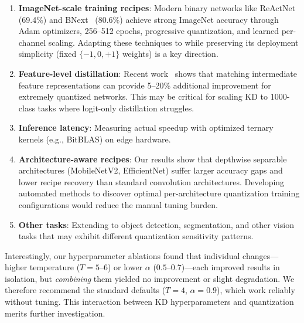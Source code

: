 \documentclass[10pt]{article}
\begin{document}
\begin{enumerate}
    \item \textbf{ImageNet-scale training recipes}: Modern binary networks like ReActNet~\cite{liu2020reactnet} (69.4\%) and BNext~\cite{guo2022bnext} (80.6\%) achieve strong ImageNet accuracy through Adam optimizers, 256--512 epochs, progressive quantization, and learned per-channel scaling. Adapting these techniques to \bitnetb{} while preserving its deployment simplicity (fixed $\{-1,0,+1\}$ weights) is a key direction.
    \item \textbf{Feature-level distillation}: Recent work~\cite{elthakeb2020dcq} shows that matching intermediate feature representations can provide 5--20\% additional improvement for extremely quantized networks. This may be critical for scaling KD to 1000-class tasks where logit-only distillation struggles.
    \item \textbf{Inference latency}: Measuring actual speedup with optimized ternary kernels (e.g., BitBLAS) on edge hardware.
    \item \textbf{Architecture-aware recipes}: Our results show that depthwise separable architectures (MobileNetV2, EfficientNet) suffer larger accuracy gaps and lower recipe recovery than standard convolution architectures. Developing automated methods to discover optimal per-architecture quantization training configurations would reduce the manual tuning burden.
    \item \textbf{Other tasks}: Extending to object detection, segmentation, and other vision tasks that may exhibit different quantization sensitivity patterns.
\end{enumerate}

Interestingly, our hyperparameter ablations found that individual changes---higher temperature ($T=5$--$6$) or lower $\alpha$ ($0.5$--$0.7$)---each improved results in isolation, but \emph{combining} them yielded no improvement or slight degradation. We therefore recommend the standard defaults ($T=4$, $\alpha=0.9$), which work reliably without tuning. This interaction between KD hyperparameters and quantization merits further investigation.


\end{document}
